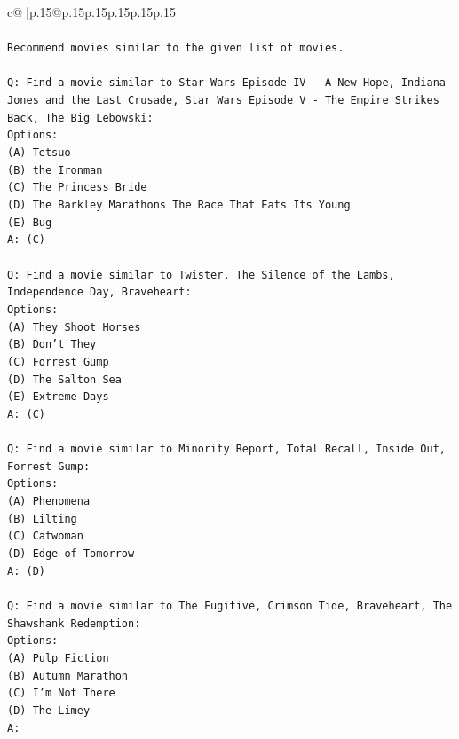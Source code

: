 \documentclass{article}
\begin{document}
{\begin{supertabular}{c@{$\;$}|p{.15\linewidth}@{}p{.15\linewidth}p{.15\linewidth}p{.15\linewidth}p{.15\linewidth}p{.15\linewidth}}
{{{\\ 
\\ 
\texttt{Recommend movies similar to the given list of movies.} \\
\\ 
\texttt{Q: Find a movie similar to Star Wars Episode IV {-} A New Hope, Indiana Jones and the Last Crusade, Star Wars Episode V {-} The Empire Strikes Back, The Big Lebowski:} \\
\texttt{Options:} \\
\texttt{(A) Tetsuo} \\
\texttt{(B) the Ironman} \\
\texttt{(C) The Princess Bride} \\
\texttt{(D) The Barkley Marathons The Race That Eats Its Young} \\
\texttt{(E) Bug} \\
\texttt{A: (C)} \\
\\ 
\texttt{Q: Find a movie similar to Twister, The Silence of the Lambs, Independence Day, Braveheart:} \\
\texttt{Options:} \\
\texttt{(A) They Shoot Horses} \\
\texttt{(B) Don't They} \\
\texttt{(C) Forrest Gump} \\
\texttt{(D) The Salton Sea} \\
\texttt{(E) Extreme Days} \\
\texttt{A: (C)} \\
\\ 
\texttt{Q: Find a movie similar to Minority Report, Total Recall, Inside Out, Forrest Gump:} \\
\texttt{Options:} \\
\texttt{(A) Phenomena} \\
\texttt{(B) Lilting} \\
\texttt{(C) Catwoman} \\
\texttt{(D) Edge of Tomorrow} \\
\texttt{A: (D)} \\
\\ 
\texttt{Q: Find a movie similar to The Fugitive, Crimson Tide, Braveheart, The Shawshank Redemption:} \\
\texttt{Options:} \\
\texttt{(A) Pulp Fiction} \\
\texttt{(B) Autumn Marathon} \\
\texttt{(C) I'm Not There} \\
\texttt{(D) The Limey} \\
\texttt{A:} \\
            }
        }
    }
     \\ \\


\end{supertabular}}
\end{document}
